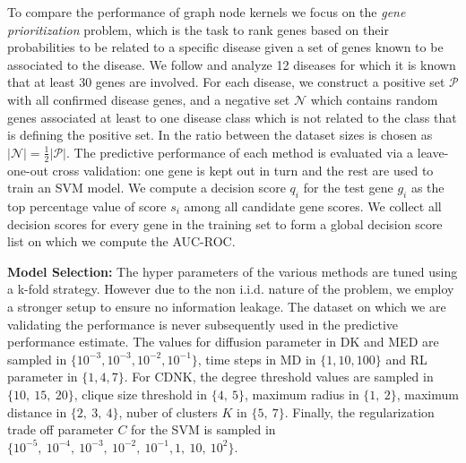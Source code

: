 \documentclass[review]{elsarticle}
\begin{document}
To compare the performance of graph node kernels we focus on the {\em gene prioritization} problem, which is the task to rank genes based on their probabilities to be related to a specific disease given a set of genes known to be associated to the disease. We follow \cite{chen2014disease} and analyze  12 diseases \cite{goh2007human} for which it is known that at least 30 genes are involved. For each disease, we construct a positive set $\mathcal{P}$ with all confirmed disease genes, and a negative set $\mathcal{N}$ which contains random genes associated at least to one disease class which is not related to the class that is defining the positive set. In \cite{chen2014disease} the ratio between the dataset sizes is chosen as $\vert \mathcal{N} \vert = \frac{1}{2} \vert \mathcal{P} \vert$. The predictive performance of each method is evaluated via a leave-one-out cross validation: one gene is kept out in turn and the rest are used to train an SVM model. We compute a decision score $q_i$ for the test gene $g_i$ as the top percentage value of score $s_i$ among all candidate gene scores. We collect all decision scores for every gene in the training set to form a global decision score list on which we compute the AUC-ROC.

\textbf{Model Selection:}
The hyper parameters of the various methods are tuned using a k-fold strategy. However due to the non i.i.d. nature of the problem, we employ a stronger setup to ensure no information leakage. The dataset on which we are validating the performance is never subsequently used in the predictive performance estimate. The values for diffusion parameter in DK and MED are sampled in $\lbrace 10^{-3}, 10^{-3}, 10^{-2}, 10^{-1} \rbrace$, time steps in MD in $\lbrace 1, 10, 100 \rbrace$ and RL parameter in $\lbrace 1, 4, 7 \rbrace$. For CDNK, the degree threshold values are sampled in $\lbrace 10,\ 15,\ 20 \rbrace$, clique size threshold in $\lbrace 4,\ 5 \rbrace$, maximum radius in $\lbrace 1,\ 2 \rbrace$, maximum distance in $\lbrace 2,\ 3,\ 4 \rbrace$, nuber of clusters $K$ in $\lbrace 5,\ 7 \rbrace$. Finally, the regularization trade off parameter $C$ for the SVM is sampled in $\lbrace 10^{-5},  \ 10^{-4}, \ 10^{-3},\ 10^{-2},\ 10^{-1}, 1,\ 10,\ 10^2 \rbrace$.
\end{document}
